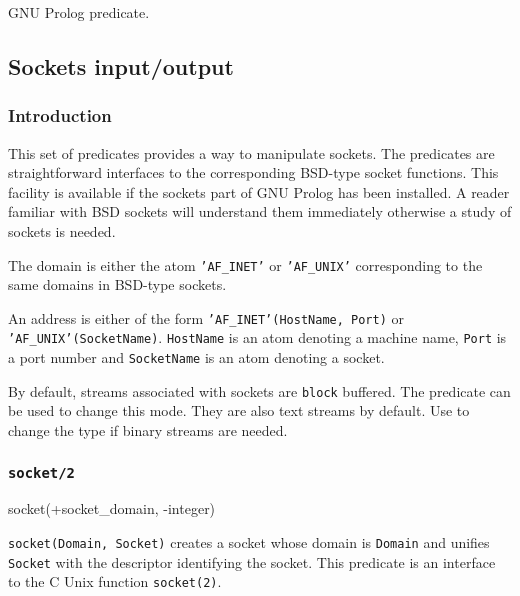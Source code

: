 \Portability

GNU Prolog predicate.

\subsection{Sockets input/output}
\label{Sockets-input/output}

\subsubsection{Introduction}
\label{Introduction:(Sockets-input/output)}
This set of predicates provides a way to manipulate sockets. The predicates
are straightforward interfaces to the corresponding BSD-type socket
functions. This facility is available if the sockets part of GNU Prolog has
been installed. A reader familiar with BSD sockets will understand them
immediately otherwise a study of sockets is needed. 

The domain is either the atom \texttt{'AF\_INET'} or \texttt{'AF\_UNIX'}
corresponding to the same domains in BSD-type sockets.

An address is either of the form \texttt{'AF\_INET'(HostName, Port)} or
\texttt{'AF\_UNIX'(SocketName)}. \texttt{HostName} is an atom denoting a
machine name, \texttt{Port} is a port number and \texttt{SocketName} is an
atom denoting a socket. 

By default, streams associated with sockets are \texttt{block} buffered. The
predicate  
can be used to change this mode. They are also text streams by default. Use
  to change the type
if binary streams are needed.

\subsubsection{\texttt{socket/2}}

\begin{TemplatesOneCol}
socket(+socket\_domain, -integer)

\end{TemplatesOneCol}

\Description

\texttt{socket(Domain, Socket)} creates a socket whose domain is
\texttt{Domain}  and unifies \texttt{Socket}
with the descriptor identifying the socket. This predicate is an interface
to the C Unix function \texttt{socket(2)}.

